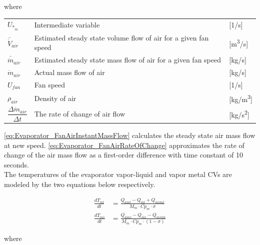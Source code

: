 where

\begin{center}
	\begin{tabular}{l p{8cm} l}
		$ 	U_{*_{\dot{m}}} $ 								& Intermediate variable												& [1/\si{s}]\\
		$\bar{\dot{V}}_{air}$						& Estimated steady state volume flow of air for a given fan speed 	& [\si{m^3}/\si{s}] \\
		$\bar{\dot{m}}_{air}$						& Estimated steady state mass flow of air for a given fan speed 	& [\si{kg}/\si{s}] \\
		$\dot{m}_{air}$								& Actual mass flow of air					  						& [\si{kg}/\si{s}] \\
		$U_{fan}$									& Fan speed 														& [1/\si{s}] \\
		$\rho_{air}$								& Density of air													& [\si{kg}/\si{m^3}] \\[0.2cm]
		$\dfrac{\Delta \dot{m}_{air}}{\Delta t} $ 	& The rate of change of	air flow 									& [\si{kg}/\si{s^2}]
	\end{tabular}
\end{center}

\cref{eq:Evaporator_FanAirInstantMassFlow} calculates the steady state air mass flow at new speed. \cref{eq:Evaporator_FanAirRateOfChange} approximates the rate of change of the air mass flow as a first-order difference with time constant of 10 seconds. \\

The temperatures of the evaporator vapor-liquid and vapor metal CVs are modeled by the two equations below respectively.

\begin{align}
	\frac{dT_{ml}}{dt} & = \frac{Q_{aml}-Q_{ml} + Q_{mvml}}{M_m \cdot Cp_m \cdot \sigma}        \\
	\frac{dT_{mv}}{dt} & = \frac{Q_{amv} - Q_{mv} - Q_{mvml}}{M_m \cdot Cp_m \cdot (1- \sigma)}
\end{align}

where


